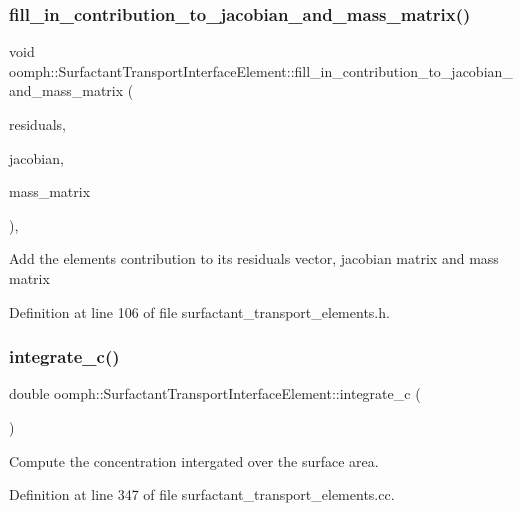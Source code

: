 \subsubsection{\texorpdfstring{fill\+\_\+in\+\_\+contribution\+\_\+to\+\_\+jacobian\+\_\+and\+\_\+mass\+\_\+matrix()}{fill\_in\_contribution\_to\_jacobian\_and\_mass\_matrix()}}
{\footnotesize\ttfamily void oomph\+::\+Surfactant\+Transport\+Interface\+Element\+::fill\+\_\+in\+\_\+contribution\+\_\+to\+\_\+jacobian\+\_\+and\+\_\+mass\+\_\+matrix (\begin{DoxyParamCaption}\item[{Vector$<$ double $>$ \&}]{residuals,  }\item[{Dense\+Matrix$<$ double $>$ \&}]{jacobian,  }\item[{Dense\+Matrix$<$ double $>$ \&}]{mass\+\_\+matrix }\end{DoxyParamCaption})\hspace{0.3cm}{\ttfamily [inline]}, {\ttfamily [protected]}}

Add the element\textquotesingle{}s contribution to its residuals vector, jacobian matrix and mass matrix 

Definition at line 106 of file surfactant\+\_\+transport\+\_\+elements.\+h.

\mbox{\label{classoomph_1_1SurfactantTransportInterfaceElement_a703c35a6da2925926c976957f2da77c4}} 
\subsubsection{\texorpdfstring{integrate\+\_\+c()}{integrate\_c()}}
{\footnotesize\ttfamily double oomph\+::\+Surfactant\+Transport\+Interface\+Element\+::integrate\+\_\+c (\begin{DoxyParamCaption}{ }\end{DoxyParamCaption})}



Compute the concentration intergated over the surface area. 



Definition at line 347 of file surfactant\+\_\+transport\+\_\+elements.\+cc.




